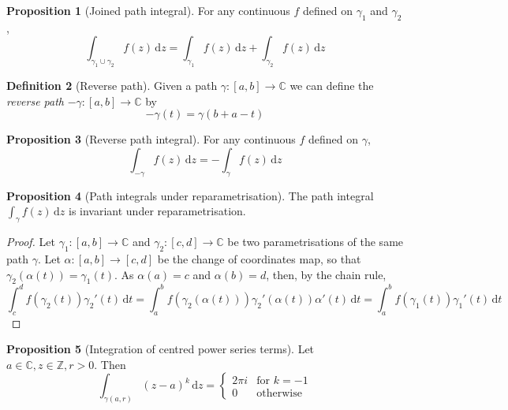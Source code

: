 \documentclass[10pt,fleqn]{article}
\newcommand{\diff}{\,\mathrm{d}}
\newcommand{\comps}{\mathbb{C}}
\theoremstyle{definition} \newtheorem{defn}{Definition}[section]
\theoremstyle{plain}      \newtheorem{thm}[defn]{Theorem}
\theoremstyle{definition} \newtheorem{prop}[defn]{Proposition}
\theoremstyle{plain}      \newtheorem{lem}[defn]{Lemma}
\theoremstyle{definition} \newtheorem{cor}[defn]{Corollary}
\theoremstyle{definition} \newtheorem{ex}[defn]{Example}
\theoremstyle{definition} \newtheorem{rem}[defn]{Remark}
\begin{document}
\begin{prop}[Joined path integral]
    For any continuous $f$ defined on $\gamma_1$ and $\gamma_2$,
    \[
        \int_{\gamma_1\cup\gamma_2} f(z)\diff z=
        \int_{\gamma_1} f(z)\diff z + \int_{\gamma_2} f(z)\diff z
    \]
\end{prop}

\begin{defn}[Reverse path]
    Given a path $\gamma:[a,b]\to\comps$ we can define the \emph{reverse path} $-\gamma:[a,b]\to\comps$ by
    \begin{equation}
        -\gamma(t)=
        \gamma(b+a-t)
    \end{equation}
\end{defn}

\begin{prop}[Reverse path integral]
    For any continuous $f$ defined on $\gamma$,
    \[
        \int_{-\gamma} f(z)\diff z=
        -\int_{\gamma} f(z)\diff z
    \]
\end{prop}

\begin{prop}[Path integrals under reparametrisation]
    The path integral $\int_{\gamma} f(z)\diff z$ is invariant under reparametrisation.
\end{prop}

\begin{proof}
    Let $\gamma_1:[a,b]\to\comps$ and $\gamma_2:[c,d]\to\comps$ be two parametrisations of the same path $\gamma$.
    Let $\alpha:[a,b]\to[c,d]$ be the change of coordinates map, so that $\gamma_2(\alpha(t))=\gamma_1(t)$.
    As $\alpha(a)=c$ and $\alpha(b)=d$, then, by the chain rule,
    \[
        \int_c^d f(\gamma_2(t))\gamma_2'(t)\diff t=
        \int_a^b f(\gamma_2(\alpha(t)))\gamma_2'(\alpha(t))\alpha'(t)\diff t=
        \int_a^b f(\gamma_1(t))\gamma_1'(t)\diff t
    \]
\end{proof}

\begin{prop}[Integration of centred power series terms]
    Let $a\in\comps,z\in\mathbb{Z},r>0$.
    Then
    \[
        \int_{\gamma(a,r)} (z-a)^k\diff z=
        \left\{
        \begin{array}{lr}
            2\pi i & \text{for }k=-1\\
            0 & \text{otherwise}
        \end{array}
        \right.
    \]
\end{prop}
\end{document}
